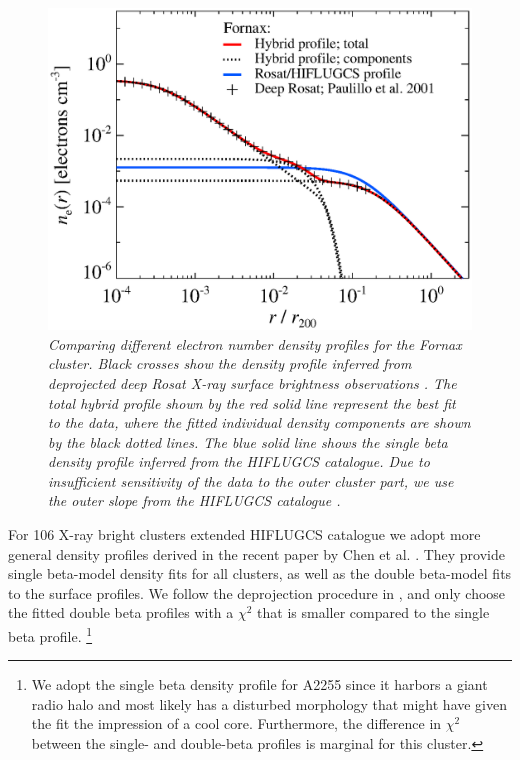 \documentclass[10pt,aps,pra,reprint,amsmath,amsfonts,amssymb,showpacs,nofootinbib,floatfix]{revtex4-1}
\begin{document}
\begin{figure}%
 \includegraphics[width=0.99\columnwidth]{figures/dens.fornax.eps}
 \caption{\it Comparing different electron number density profiles for
   the Fornax cluster. Black crosses show the density profile inferred
   from deprojected deep Rosat X-ray surface brightness observations
   \protect \cite{2002ApJ...565..883P}. The total hybrid profile shown
   by the red solid line represent the best fit to the data, where the
   fitted individual density components are shown by the black dotted
   lines. The blue solid line shows the single beta density profile
   inferred from the HIFLUGCS catalogue. Due to insufficient
   sensitivity of the data to the outer cluster part, we use the outer
   slope from the HIFLUGCS catalogue \cite{2007A&A...466..805C}.}
 \label{fig:dens_fornax}
\end{figure}

For 106 X-ray bright clusters extended HIFLUGCS catalogue we adopt
more general density profiles derived in the recent paper by Chen et
al. \cite{2007A&A...466..805C}. They provide single beta-model density
fits for all clusters, as well as the double beta-model fits to the
surface profiles. We follow the deprojection procedure in
\cite{2004A&A...413...17P}, and only choose the fitted double beta
profiles with a $\chi^2$ that is smaller compared to the single beta
profile. \footnote{We adopt the single beta density profile for A2255
  since it harbors a giant radio halo and most likely has a disturbed
  morphology that might have given the fit the impression of a cool
  core. Furthermore, the difference in $\chi^2$ between the single-
  and double-beta profiles is marginal for this cluster.}
\end{document}
